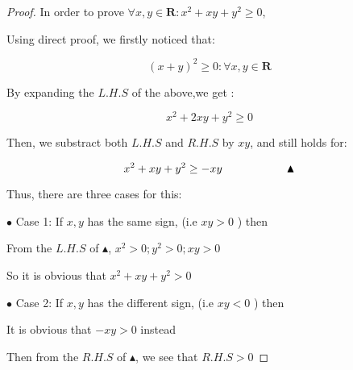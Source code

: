 \documentclass[12pt]{article}
\begin{document}
\vspace{0.3cm}

\begin{proof}
    
    In order to prove $ \forall x, y \in \mathbf{R} : x^2 +xy + y^2 \geq 0$,

    \vspace*{0.3cm}
    \hspace*{1.2cm}
    Using direct proof, we firstly noticed that:

    \[ (x+y)^2 \geq 0 : \forall x,y \in \mathbf{R}\]

    \vspace*{0.3cm}
    \hspace*{1.2cm}
    By expanding the $L.H.S$ of the above,we get :

    \[ x^2 + 2xy + y^2 \geq 0 \]

    \vspace*{0.3cm}
    \hspace*{1.2cm}
    Then, we substract both $L.H.S$ and $R.H.S$ by $xy$, and still holds for:

    \[ x^2 + xy + y^2 \geq -xy \hspace*{2cm} \blacktriangle \]

    \vspace*{0.3cm}
    \hspace*{1.2cm}
    Thus, there are three cases for this:

    \vspace*{0.5cm}
    \hspace*{2.5cm}
    $\bullet$ Case 1: If $x,y$ has the same sign, (i.e $xy > 0$ ) then

    \vspace*{0.3cm}
    \hspace*{2.9cm}
    From the $L.H.S$ of $\blacktriangle$, $x^2 > 0;  y^2 > 0;  xy>0$

    \vspace*{0.3cm}
    \hspace*{2.9cm}
    So it is obvious that $x^2 + xy +y^2 > 0$

    \newpage
    \hspace*{2.5cm}
    $\bullet$ Case 2: If $x,y$ has the different sign, (i.e $xy < 0$ ) then

    
    \vspace*{0.3cm}
    \hspace*{2.9cm}
    It is obvious that $-xy > 0$ instead

    \vspace*{0.3cm}
    \hspace*{2.9cm}
    Then from the $R.H.S$ of $\blacktriangle$, we see that $R.H.S > 0$


\end{proof}
\end{document}
